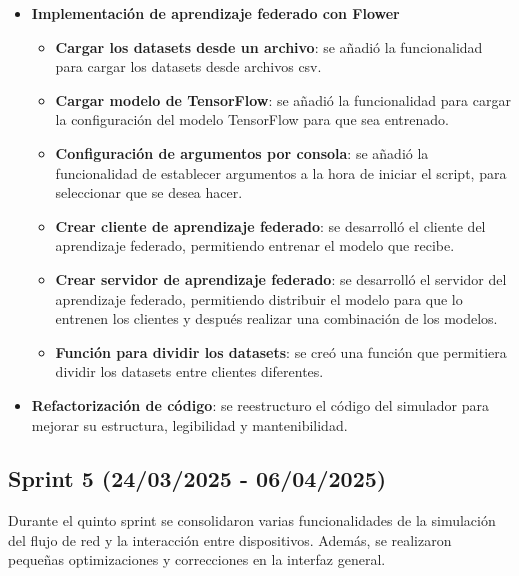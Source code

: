 \begin{itemize}
    \item \textbf{Implementación de aprendizaje federado con Flower}
    \begin{itemize}
        \item \textbf{Cargar los datasets desde un archivo}: se añadió la funcionalidad para cargar los datasets desde archivos csv.
        \item \textbf{Cargar modelo de TensorFlow}: se añadió la funcionalidad para cargar la configuración del modelo TensorFlow para que sea entrenado.
        \item \textbf{Configuración de argumentos por consola}: se añadió la funcionalidad de establecer argumentos a la hora de iniciar el script, para seleccionar que se desea hacer.
        \item \textbf{Crear cliente de aprendizaje federado}: se desarrolló el cliente del aprendizaje federado, permitiendo entrenar el modelo que recibe.
        \item \textbf{Crear servidor de aprendizaje federado}: se desarrolló el servidor del aprendizaje federado, permitiendo distribuir el modelo para que lo entrenen los clientes y después realizar una combinación de los modelos.
        \item \textbf{Función para dividir los datasets}: se creó una función que permitiera dividir los datasets entre clientes diferentes.
    \end{itemize}
    \item \textbf{Refactorización de código}: se reestructuro el código del simulador para mejorar su estructura, legibilidad y mantenibilidad.
\end{itemize}

\subsection{Sprint 5 (24/03/2025 - 06/04/2025)}
\label{subsec:QuintoSprint}
Durante el quinto sprint se consolidaron varias funcionalidades de la simulación del flujo de red y la interacción entre dispositivos. Además, se realizaron pequeñas optimizaciones y correcciones en la interfaz general.

